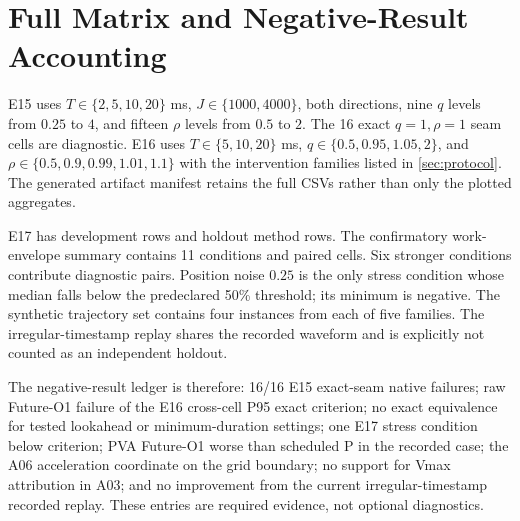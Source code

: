 \section{Full Matrix and Negative-Result Accounting}
\label{app:matrices}

E15 uses $T\in\{2,5,10,20\}$ ms, $J\in\{1000,4000\}$, both directions, nine $q$ levels from $0.25$ to $4$, and fifteen $\rho$ levels from $0.5$ to $2$. The 16 exact $q=1,\rho=1$ seam cells are diagnostic. E16 uses $T\in\{5,10,20\}$ ms, $q\in\{0.5,0.95,1.05,2\}$, and $\rho\in\{0.5,0.9,0.99,1.01,1.1\}$ with the intervention families listed in \cref{sec:protocol}. The generated artifact manifest retains the full CSVs rather than only the plotted aggregates.

E17 has \ESeventeenDevelopmentRowCount{} development rows and \ESeventeenHoldoutRowCount{} holdout method rows. The confirmatory work-envelope summary contains 11 conditions and \ESeventeenWorkPairCount{} paired cells. Six stronger conditions contribute \ESeventeenStressPairCount{} diagnostic pairs. Position noise $0.25$ is the only stress condition whose median falls below the predeclared 50\% threshold; its minimum is negative. The synthetic trajectory set contains four instances from each of five families. The irregular-timestamp replay shares the recorded waveform and is explicitly not counted as an independent holdout.

The negative-result ledger is therefore: 16/16 E15 exact-seam native failures; raw Future-O1 failure of the E16 cross-cell P95 exact criterion; no exact equivalence for tested lookahead or minimum-duration settings; one E17 stress condition below criterion; PVA Future-O1 worse than scheduled P in the recorded case; the A06 acceleration coordinate on the grid boundary; no support for Vmax attribution in A03; and no improvement from the current irregular-timestamp recorded replay. These entries are required evidence, not optional diagnostics.
